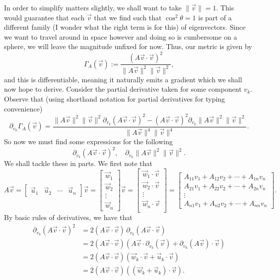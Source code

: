\documentclass[a4paper, 12pt]{article}
\begin{document}
In order to simplify matters slightly, we shall want to take \( \| \vec{v} \| = 1 \). This would guarantee that each \( \vec{v} \) that we find such that \( \cos^2{\theta} = 1 \) is part of a different family (I wonder what the right term is for this) of eigenvectors. Since we want to travel around in space however and doing so is cumbersome on a sphere, we will leave the magnitude unfixed for now. Thus, our metric is given by
\[
    \Gamma_A (\vec{v}) := \frac{(A \vec{v} \cdot \vec{v})^2}{\| A \vec{v} \|^2 \| \vec{v} \|^2}
,\]
and this is differentiable, meaning it naturally emits a gradient which we shall now hope to derive. Consider the partial derivative taken for some component \( v_k \). Observe that (using shorthand notation for partial derivatives for typing convenience)
\[
    \partial_{v_k} \Gamma_A (\vec{v}) = \frac{\| A \vec{v} \|^2 \| \vec{v} \|^2 \partial_{v_k} (A \vec{v} \cdot \vec{v})^2 - (A\vec{v} \cdot \vec{v})^2 \partial_{v_k} \| A \vec{v} \|^2 \| \vec{v} \|^2}{\| A \vec{v} \|^4 \| \vec{v} \|^4}
.\]
So now we must find some expressions for the following
\[
    \partial_{v_k} (A\vec{v} \cdot \vec{v})^2, \quad \partial_{v_k} \| A \vec{v} \|^2 \| \vec{v} \|^2
.\]
We shall tackle these in parts. We first note that
\[
    A \vec{v} = \begin{bmatrix} \vec{u}_1 & \vec{u}_2 & \cdots & \vec{u}_n \end{bmatrix} \vec{v} = \begin{bmatrix} \vec{w}_1 \\ \vec{w}_2 \\ \vdots \\ \vec{w}_n \end{bmatrix} \vec{v} = \begin{bmatrix}
        \vec{w}_1 \cdot \vec{v} \\
        \vec{w}_2 \cdot \vec{v} \\
        \vdots \\
        \vec{w}_n \cdot \vec{v} \\
    \end{bmatrix} = \begin{bmatrix}
        A_{11} v_1 + A_{12} v_2 + \cdots + A_{1n} v_n \\
        A_{21} v_1 + A_{22} v_2 + \cdots + A_{2n} v_n \\
        \vdots \\
        A_{n1} v_1 + A_{n2} v_2 + \cdots + A_{nn} v_n
    \end{bmatrix}
.\]
By basic rules of derivatives, we have that
\begin{align*}
    \partial_{v_k} (A \vec{v} \cdot \vec{v})^2 &= 2 (A \vec{v} \cdot \vec{v}) \, \partial_{v_k} (A \vec{v} \cdot \vec{v}) \\
    &= 2 (A \vec{v} \cdot \vec{v}) (A \vec{v} \cdot \partial_{v_k} (\vec{v}) + \partial_{v_k} (A \vec{v}) \cdot \vec{v}) \\
    &= 2 (A \vec{v} \cdot \vec{v}) (\vec{w}_k \cdot \vec{v} + \vec{u}_k \cdot \vec{v}) \\
    &= 2 (A \vec{v} \cdot \vec{v}) ((\vec{w}_k + \vec{u}_k) \cdot \vec{v})
.\end{align*}
\end{document}
